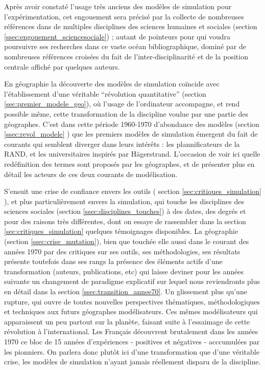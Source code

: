 Après avoir constaté l'usage très anciens des modèles de simulation pour l'expérimentation, cet engouement sera précisé par la collecte de nombreuses références dans de multiples disciplines des sciences humaines et sociales (section \ref{ssec:engouement_sciencesociale}) ; autant de pointeurs pour qui voudra poursuivre ses recherches dans ce vaste océan bibliographique, dominé par de nombreuses références croisées du fait de l'inter-disciplinarité et de la position centrale affiché par quelques auteurs.

En géographie la découverte des modèles de simulation coïncide avec l'établissement d'une véritable \enquote{révolution quantitative} (section \ref{sec:premier_modele_geo}), où l'usage de l'ordinateur accompagne, et rend possible même, cette transformation de la discipline voulue par une partie des géographes. C'est dans cette période 1960-1970 d'abondance des modèles (section \ref{ssec:revol_modele} ) que les premiers modèles de simulation émergent du fait de courants qui semblent diverger dans leurs intérêts : les plannificateurs de la RAND, et les universitaires inspirés par Hägerstrand. L'occasion de voir ici quelle redéfinition des termes sont proposés par les géographes, et de présenter plus en détail les acteurs de ces deux courants de modélisation.

S'ensuit une crise de confiance envers les outils ( section \ref{sec:critiques_simulation} ), et plus particulièrement envers la simulation, qui touche les disciplines des sciences sociales (section \ref{ssec:disciplines_touches}) à des dates, des degrés et pour des raisons très différentes, dont on essaye de rassembler dans la section \ref{sec:critiques_simulation} quelques témoignages disponibles. La géographie (section \ref{ssec:crise_mutation}), bien que touchée elle aussi dans le courant des années 1970 par des critiques sur ses outils, ses méthodologies, ses résultats présente toutefois dans ses rangs la présence des éléments actifs d'une transformation (auteurs, publications, etc) qui laisse deviner pour les années suivante un changement de paradigme explicatif sur lequel nous reviendronts plus en détail dans la section \ref{ssec:transition_annee70}. Un glissement plus qu'une rupture, qui ouvre de toutes nouvelles perspectives thématiques, méthodologiques et techniques aux futurs géographes modélisateurs. Ces mêmes modélisateurs qui apparaissent un peu partout sur la planète, faisant suite à l'essaimage de cette révolution à l'international. Les Français découvrent brutalement dans les années 1970 ce bloc de 15 années d'expériences - positives et négatives - acccumulées par les pionniers. On parlera donc plutôt ici d'une transformation que d'une véritable crise, les modèles de simulation n'ayant jamais réellement disparu de la discipline. 

